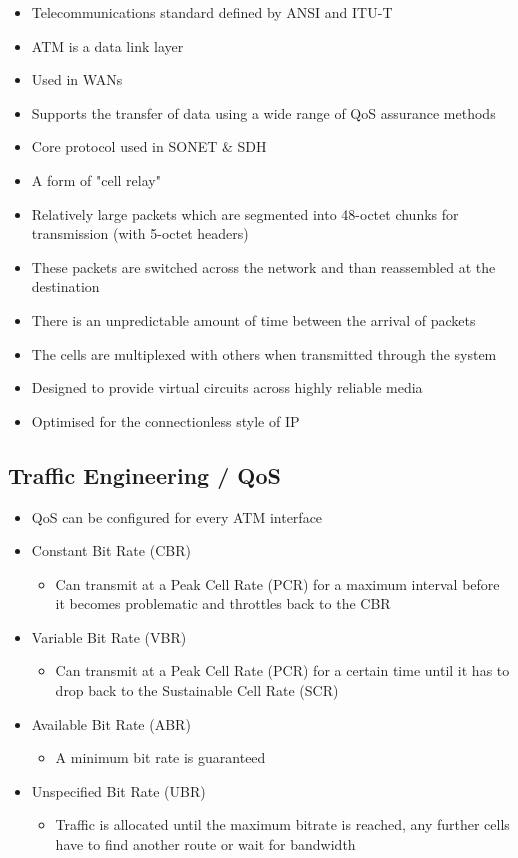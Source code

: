 
\begin{itemize}
  \item Telecommunications standard defined by ANSI and ITU-T
  \item ATM is a data link layer
  \item Used in WANs
  \item Supports the transfer of data using a wide range of QoS assurance methods
  \item Core protocol used in SONET \& SDH
  \item A form of "cell relay"
  \item Relatively large packets which are segmented into 48-octet chunks for transmission (with 5-octet headers)
  \item These packets are switched across the network and than reassembled at the destination
  \item There is an unpredictable amount of time between the arrival of packets
  \item The cells are multiplexed with others when transmitted through the system
  \item Designed to provide virtual circuits across highly reliable media
  \item Optimised for the connectionless style of IP
\end{itemize}

\subsection*{Traffic Engineering / QoS}

\begin{itemize}
  \item QoS can be configured for every ATM interface
  \item Constant Bit Rate (CBR)
  \begin{itemize}
    \item Can transmit at a Peak Cell Rate (PCR) for a maximum interval before it becomes problematic and throttles back to the CBR
  \end{itemize}
  \item Variable Bit Rate (VBR)
  \begin{itemize}
    \item Can transmit at a Peak Cell Rate (PCR) for a certain time until it has to drop back to the Sustainable Cell Rate (SCR)
  \end{itemize}
  \item Available Bit Rate (ABR)
  \begin{itemize}
    \item A minimum bit rate is guaranteed
  \end{itemize}
  \item Unspecified Bit Rate (UBR)
  \begin{itemize}
    \item Traffic is allocated until the maximum bitrate is reached, any further cells have to find another route or wait for bandwidth
  \end{itemize}
\end{itemize}
